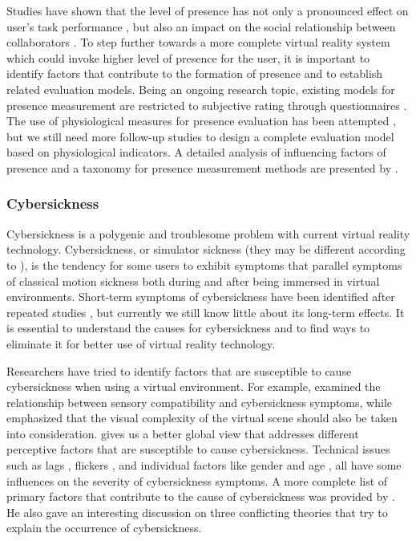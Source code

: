 Studies have shown that the level of presence has not only a pronounced effect on user's task performance \citep{Dangelo2008Benefits}, but also an impact on the social relationship between collaborators \citep{Slater2000Small}. To step further towards a more complete virtual reality system which could invoke higher level of presence for the user, it is important to identify factors that contribute to the formation of presence and to establish related evaluation models. Being an ongoing research topic, existing models for presence measurement are restricted to subjective rating through questionnaires \citep{Usoh2000Using, Witmer1998MPV}. The use of physiological measures for presence evaluation has been attempted \citep{Meehan2002Physiological}, but we still need more follow-up studies to design a complete evaluation model based on physiological indicators. A detailed analysis of influencing factors of presence and a taxonomy for presence measurement methods are presented by \citet{Schuemie2001Pres}.


\subsubsection{Cybersickness}
Cybersickness is a polygenic \citep{Kennedy1992Simulator} and troublesome problem with current virtual reality technology. Cybersickness, or simulator sickness (they may be different according to \citet{Stanney1997Cybersickness}), is the tendency for some users to exhibit symptoms that parallel symptoms of classical motion sickness both during and after being immersed in virtual environments. Short-term symptoms of cybersickness have been identified after repeated studies \citep{Lawson2002Signs}, but currently we still know little about its long-term effects. It is essential to understand the causes for cybersickness and to find ways to eliminate it for better use of virtual reality technology.

Researchers have tried to identify factors that are susceptible to cause cybersickness when using a virtual environment. For example, \citet{Rich1996AICS} examined the relationship between sensory compatibility and cybersickness symptoms, while \citet{So2002Scene} emphasized that the visual complexity of the virtual scene should also be taken into consideration. \citet{Stanney2002HPIVE} gives us a better global view that addresses different perceptive factors that are susceptible to cause cybersickness. Technical issues such as lags \citep{Pausch1992Literature}, flickers \citep{Harwood1987Temporal}, and individual factors like gender \citep{Biocca1992Will} and age \citep{Reason1975Motion}, all have some influences on the severity of cybersickness symptoms. A more complete list of primary factors that contribute to the cause of cybersickness was provided by \citet{LaViola2000DCV}. He also gave an interesting discussion on three conflicting theories that try to explain the occurrence of cybersickness.


